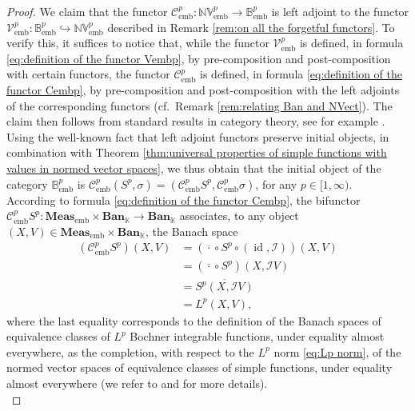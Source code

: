 \documentclass{amsart}
\theoremstyle{definition}
\theoremstyle{plain}
\newcommand{\id}{\operatorname{id}}
\newcommand{\embMeas}{\mathbf{Meas}_\mathrm{emb}}
\newcommand{\NVembp}{\mathbb{NV}_{\mathrm{emb}}^p}
\newcommand{\Ban}{\mathbf{Ban}_{\mathbb{K}}}
\newcommand{\Bembp}{\mathbb{B}_{\mathrm{emb}}^p}
\begin{document}
\begin{proof}
            We claim that the functor $\mathcal{C}_{\mathrm{emb}}^p \colon \NVembp \rightarrow \Bembp$ is left adjoint to the functor $\mathcal{V}_{\mathrm{emb}}^p \colon \Bembp \hookrightarrow \NVembp$ described in Remark \ref{rem:on all the forgetful functors}.                 
            To verify this, it suffices to notice that, while the functor $\mathcal{V}_{\mathrm{emb}}^p$ is defined, in formula \eqref{eq:definition of the functor Vembp}, by pre-composition and post-composition with certain functors, the functor $\mathcal{C}_{\mathrm{emb}}^p$ is defined, in formula \eqref{eq:definition of the functor Cembp}, by pre-composition and post-composition with the left adjoints of the corresponding functors (cf.~Remark \ref{rem:relating Ban and NVect}).
            The claim then follows from standard results in category theory, see for example \cite[Proposition 4.4.6]{Riehl2016}. \\
            Using the well-known fact that left adjoint functors preserve initial objects, in combination with Theorem \ref{thm:universal properties of simple functions with values in normed vector spaces}, we thus obtain that the initial object of the category $\Bembp$ is $\mathcal{C}_{\mathrm{emb}}^p(S^p,\sigma) = \left( \mathcal{C}_{\mathrm{emb}}^p S^p,\mathcal{C}_{\mathrm{emb}}^p \sigma \right)$, for any $p \in [1,\infty)$. \\
            According to formula \eqref{eq:definition of the functor Cembp}, the bifunctor $\mathcal{C}_{\mathrm{emb}}^p S^p \colon \embMeas \times \Ban \rightarrow \Ban$ associates, to any object $(X,V) \in \embMeas \times \Ban$, the Banach space
            \begin{equation*}
                \begin{split}
                    \left( \mathcal{C}_{\mathrm{emb}}^p S^p \right)(X,V) &= \left( \overline{\cdot} \circ S^p \circ (\id,\mathcal{I}) \right)(X,V) \\
                    &= \left( \overline{\cdot} \circ S^p \right)(X,\mathcal{I}V) \\
                    &= \overline{S^p(X,\mathcal{I}V)} \\
                    &= L^p(X,V), 
                \end{split}
            \end{equation*}
            where the last equality corresponds to the definition of the Banach spaces of equivalence classes of $L^p$ Bochner integrable functions, under equality almost everywhere, as the completion, with respect to the $L^p$ norm \eqref{eq:Lp norm}, of the normed vector spaces of equivalence classes of simple functions, under equality almost everywhere (we refer to \cite{Cohn2013} and \cite{Yosida1995} for more details). \\

\end{proof}
\end{document}

